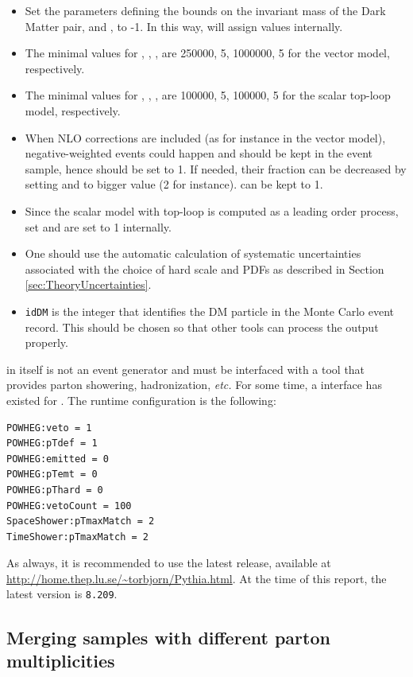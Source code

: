\begin{itemize}
\item Set the parameters defining the bounds on the invariant mass of the Dark Matter pair, \masslow and \masshigh, to -1. In this way, \powheg will assign values internally. 
\item The minimal values for \ncallOne, \itmxOne, \ncallTwo, \itmxTwo are 250000, 5, 1000000, 5 for the vector model, respectively.
\item The minimal values for \ncallOne, \itmxOne, \ncallTwo, \itmxTwo are 100000, 5, 100000, 5 for the scalar top-loop model, respectively.
\item When NLO corrections are included (as for instance in the
  vector model), negative-weighted events could happen and should
  be kept in the event sample, hence \withnegweights should be set to
  1. If needed, their fraction can be decreased by setting \foldsci
  and \foldy to bigger value (2 for instance). \foldphi can be kept to
  1.
\item Since the scalar model with top-loop is computed as a leading order process, set \LOevents and \bornonly are set to 1 internally.
\item One should use the automatic calculation of systematic uncertainties associated with the choice of hard scale and PDFs as described in Section\,\ref{sec:TheoryUncertainties}.

\item \texttt{idDM} is the integer that identifies the DM particle in the Monte Carlo event record.  This should be chosen so that other tools can process the \powheg output properly.

\end{itemize}


\powheg in itself is not an event generator and must be interfaced with a tool that provides parton showering, hadronization, \textit{etc.}   For some time, a
\pythiaEight \cite{Sjostrand:2014zea} interface
has existed for \powheg.  The \pythiaEight runtime configuration is
the following:

\begin{verbatim}
POWHEG:veto = 1
POWHEG:pTdef = 1
POWHEG:emitted = 0
POWHEG:pTemt = 0
POWHEG:pThard = 0
POWHEG:vetoCount = 100
SpaceShower:pTmaxMatch = 2
TimeShower:pTmaxMatch = 2
\end{verbatim}
As always, it is recommended to use the latest \pythiaEight release,
available at \url{http://home.thep.lu.se/~torbjorn/Pythia.html}.
At the time of this report, the latest version is \texttt{8.209}.

\subsection{Merging samples with different parton multiplicities}
\label{sec:monojet_parton_match}

